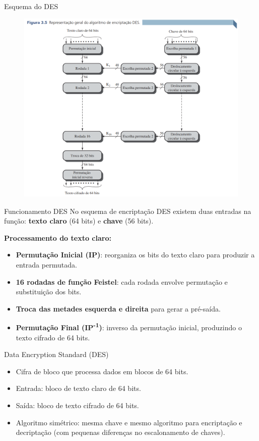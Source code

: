 \begin{frame}{Esquema do DES}


\begin{figure}
    \centering
    \includegraphics[width=0.6\linewidth]{Figuras/DES-esquema.png}

\end{figure}

\end{frame}

\begin{frame}{Funcionamento DES}
    No esquema de encriptação DES existem duas entradas na função: 
    \textbf{texto claro} (64 bits) e \textbf{chave} (56 bits).

    \vspace{0.3cm}
    \textbf{Processamento do texto claro:}
    \begin{itemize}
        \item \textbf{Permutação Inicial (IP)}: reorganiza os bits do texto claro para produzir a entrada permutada.
        \item \textbf{16 rodadas de função Feistel}: cada rodada envolve permutação e substituição dos bits.
        \item \textbf{Troca das metades esquerda e direita} para gerar a pré-saída.
        \item \textbf{Permutação Final (IP\textsuperscript{-1})}: inverso da permutação inicial, produzindo o texto cifrado de 64 bits.
    \end{itemize}


   
\end{frame}

\begin{frame}{Data Encryption Standard (DES)}
    \begin{itemize}
        \item Cifra de bloco que processa dados em blocos de 64 bits.
        \item Entrada: bloco de texto claro de 64 bits.
        \item Saída: bloco de texto cifrado de 64 bits.
        \item Algoritmo simétrico: mesma chave e mesmo algoritmo para encriptação e decriptação (com pequenas diferenças no escalonamento de chaves).
    \end{itemize}



\end{frame}

